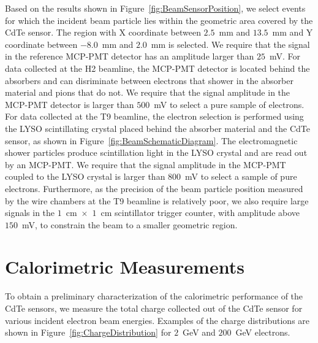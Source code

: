 \documentclass[preprint,1p]{elsarticle}
\begin{document}
Based on the results shown in Figure~\ref{fig:BeamSensorPosition}, we select events
for which the incident beam particle lies within the geometric area covered by the 
CdTe sensor. The region with X coordinate between $2.5$~mm and $13.5$~mm and
Y coordinate between $-8.0$~mm and $2.0$~mm is selected. We require that the 
signal in the reference MCP-PMT detector has an amplitude larger than $25$~mV. 
For data collected at the H2 beamline, the MCP-PMT detector is located behind
the absorbers and can disriminate between electrons that shower in the absorber
material and pions that do not. We require that the signal amplitude in the 
MCP-PMT detector is larger than $500$~mV to select a pure sample of electrons. For
data collected at the T9 beamline, the electron selection is performed using
the LYSO scintillating crystal placed behind the absorber material and the CdTe sensor,
as shown in Figure~\ref{fig:BeamSchematicDiagram}. The electromagnetic shower particles produce
scintillation light in the LYSO crystal and are read out by an MCP-PMT. We require that
the signal amplitude in the MCP-PMT coupled to the LYSO crystal is larger than $800$~mV
to select a sample of pure electrons. Furthermore, as the precision of the beam particle position 
measured by the wire chambers at the T9 beamline is relatively poor, we also require
large signals in the $1$~cm~$\times$~$1$~cm scintillator trigger counter, with
amplitude above $150$~mV, to constrain the beam to a smaller geometric region. 


\section{Calorimetric Measurements} 
\label{sec:calorimetery} 

To obtain a preliminary characterization of the calorimetric performance 
of the CdTe sensors, we measure the total charge collected out of the CdTe 
sensor for various incident electron beam energies. Examples of the 
charge distributions are shown in Figure~\ref{fig:ChargeDistribution}
for $2$~GeV and $200$~GeV electrons.
\end{document}
